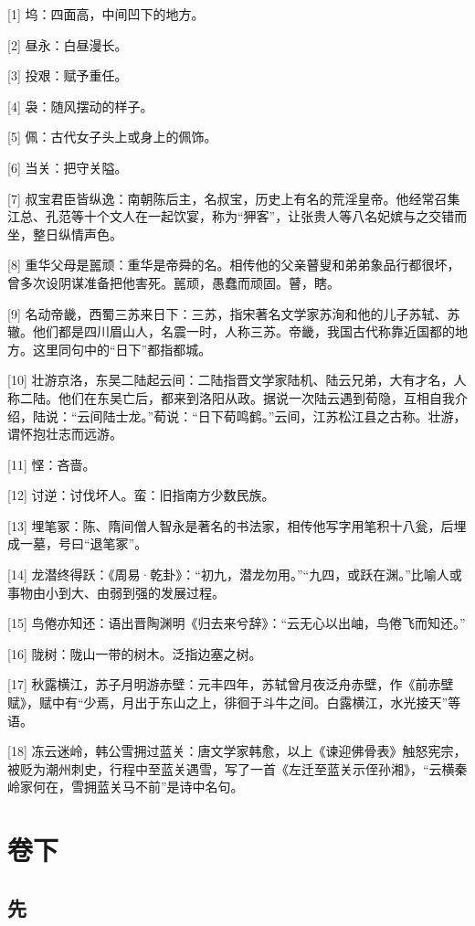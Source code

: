 \documentclass[12pt,UTF8]{ctexbook}
\begin{document}
[1] 坞：四面高，中间凹下的地方。

[2] 昼永：白昼漫长。

[3] 投艰：赋予重任。

[4] 袅：随风摆动的样子。

[5] 佩：古代女子头上或身上的佩饰。

[6] 当关：把守关隘。

[7] 叔宝君臣皆纵逸：南朝陈后主，名叔宝，历史上有名的荒淫皇帝。他经常召集江总、孔范等十个文人在一起饮宴，称为“狎客”，让张贵人等八名妃嫔与之交错而坐，整日纵情声色。

[8] 重华父母是嚚顽：重华是帝舜的名。相传他的父亲瞽叟和弟弟象品行都很坏，曾多次设阴谋准备把他害死。嚚顽，愚蠢而顽固。瞽，瞎。

[9] 名动帝畿，西蜀三苏来日下：三苏，指宋著名文学家苏洵和他的儿子苏轼、苏辙。他们都是四川眉山人，名震一时，人称三苏。帝畿，我国古代称靠近国都的地方。这里同句中的“日下”都指都城。

[10] 壮游京洛，东吴二陆起云间：二陆指晋文学家陆机、陆云兄弟，大有才名，人称二陆。他们在东吴亡后，都来到洛阳从政。据说一次陆云遇到荀隐，互相自我介绍，陆说：“云间陆士龙。”荀说：“日下荀鸣鹤。”云间，江苏松江县之古称。壮游，谓怀抱壮志而远游。

[11] 悭：吝啬。

[12] 讨逆：讨伐坏人。蛮：旧指南方少数民族。

[13] 埋笔冢：陈、隋间僧人智永是著名的书法家，相传他写字用笔积十八瓮，后埋成一墓，号曰“退笔冢”。

[14] 龙潜终得跃：《周易·乾卦》：“初九，潜龙勿用。”“九四，或跃在渊。”比喻人或事物由小到大、由弱到强的发展过程。

[15] 鸟倦亦知还：语出晋陶渊明《归去来兮辞》：“云无心以出岫，鸟倦飞而知还。”

[16] 陇树：陇山一带的树木。泛指边塞之树。

[17] 秋露横江，苏子月明游赤壁：元丰四年，苏轼曾月夜泛舟赤壁，作《前赤壁赋》，赋中有“少焉，月出于东山之上，徘徊于斗牛之间。白露横江，水光接天”等语。

[18] 冻云迷岭，韩公雪拥过蓝关：唐文学家韩愈，以上《谏迎佛骨表》触怒宪宗，被贬为潮州刺史，行程中至蓝关遇雪，写了一首《左迁至蓝关示侄孙湘》，“云横秦岭家何在，雪拥蓝关马不前”是诗中名句。


\part{卷下}

\setcounter{chapter}{0}

\chapter{先}
\end{document}
